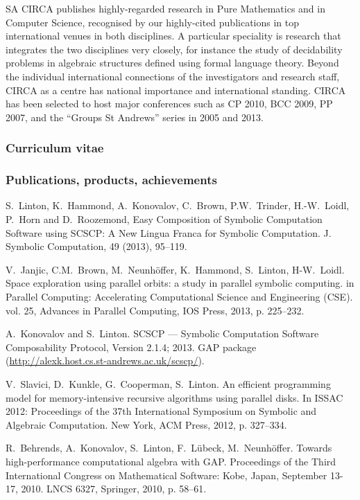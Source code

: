 \begin{sitedescription}{SA}
CIRCA publishes highly-regarded research in Pure Mathematics and in
Computer Science, recognised by our highly-cited publications in top
international venues in both disciplines. A particular speciality is
research that integrates the two disciplines very closely, for
instance the study of decidability problems in algebraic structures
defined using formal language theory. Beyond the individual international connections of the 
investigators and research staff, CIRCA as a centre has national 
importance and international standing. CIRCA has been selected to host 
major conferences such as CP 2010, BCC 2009, PP 2007, and the 
``Groups St Andrews'' series in 2005 and 2013.


\subsubsection*{Curriculum vitae}





%


\subsubsection*{Publications, products, achievements}

\begin{compactenum}
\item 
S.~Linton, K.~Hammond, A.~Konovalov, C.~Brown, P.W.~Trinder, H.-W.~Loidl, 
P.~Horn and D.~Roozemond, Easy Composition of Symbolic Computation Software using 
SCSCP: A New Lingua Franca for Symbolic Computation.
J. Symbolic Computation, 49 (2013), 95--119.
\item
V.~Janjic, C.M.~Brown, M.~Neunh{\"o}ffer, K.~Hammond, S.~Linton, H-W.~Loidl. 
Space exploration using parallel orbits: a study in parallel symbolic computing.
in Parallel Computing: Accelerating Computational Science and Engineering (CSE). 
vol. 25, Advances in Parallel Computing, IOS Press, 2013, p. 225--232.
\item 
A.~Konovalov and S.~Linton. 
SCSCP --- Symbolic Computation Software Composability Protocol, 
Version 2.1.4; 2013. GAP package (\url{http://alexk.host.cs.st-andrews.ac.uk/scscp/}).
\item
V.~Slavici, D.~Kunkle, G.~Cooperman, S.~Linton. 
An efficient programming model for memory-intensive recursive 
algorithms using parallel disks. In ISSAC 2012: Proceedings of 
the 37th International Symposium on Symbolic and Algebraic Computation. 
New York, ACM Press, 2012, p. 327--334.
\item 
R.~Behrends, A.~Konovalov, S.~Linton, F.~L{\"u}beck, M.~Neunh{\"o}ffer.
Towards high-performance computational algebra with GAP.
Proceedings of the Third International Congress on Mathematical Software: 
Kobe, Japan, September 13-17, 2010. LNCS 6327, Springer, 2010, p. 58--61.


\end{compactenum}
\end{sitedescription}
